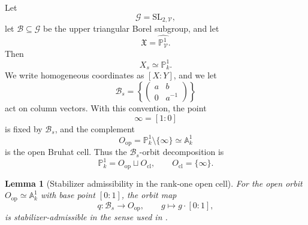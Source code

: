 \documentclass[11pt]{amsart}
\theoremstyle{plain}
\newtheorem{lemma}{Lemma}[section]
\theoremstyle{definition}
\theoremstyle{remark}
\begin{document}
Let
\[
  \mathcal G=\mathrm{SL}_{2,\mathcal V},
\]
let \(\mathcal B\subseteq\mathcal G\) be the upper triangular Borel subgroup,
and let
\[
  \mathfrak X=\widehat{\mathbb P^1_{\mathcal V}}.
\]
Then
\[
  X_s\simeq \mathbb P^1_k.
\]
We write homogeneous coordinates as \([X:Y]\), and we let
\[
  \mathcal B_s=
  \left\{
  \begin{pmatrix}
  a & b \\
  0 & a^{-1}
  \end{pmatrix}
  \right\}
\]
act on column vectors. With this convention, the point
\[
  \infty=[1:0]
\]
is fixed by \(\mathcal B_s\), and the complement
\[
  O_{\mathrm{op}}=\mathbb P^1_k\setminus\{\infty\}
  \simeq \mathbb A^1_k
\]
is the open Bruhat cell. Thus the \(\mathcal B_s\)-orbit decomposition is
\[
  \mathbb P^1_k=O_{\mathrm{op}}\sqcup O_{\mathrm{cl}},
  \qquad
  O_{\mathrm{cl}}=\{\infty\}.
\]

\begin{lemma}[Stabilizer admissibility in the rank-one open cell]
\label{lem:SL2-open-cell-admissible}
For the open orbit \(O_{\mathrm{op}}\simeq\mathbb A^1_k\) with base point
\([0:1]\), the orbit map
\[
  q:\mathcal B_s\longrightarrow O_{\mathrm{op}},
  \qquad
  g\longmapsto g\cdot[0:1],
\]
is stabilizer-admissible in the sense used in
.
\end{lemma}
\end{document}
